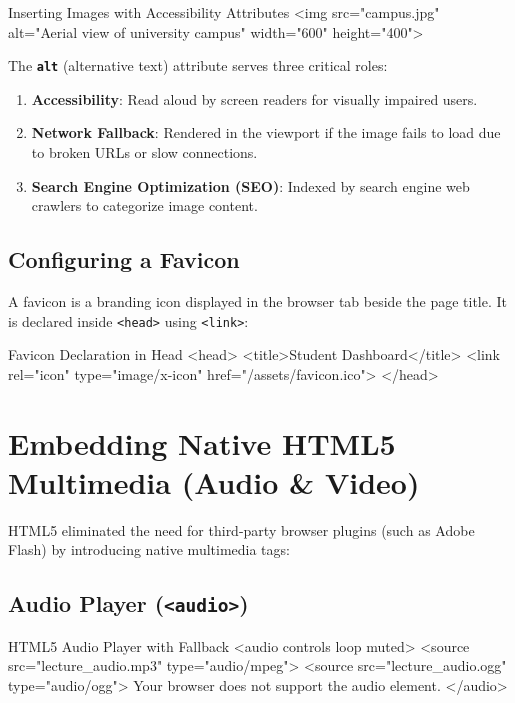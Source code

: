 \begin{htmlcode}{Inserting Images with Accessibility Attributes}
<img src="campus.jpg" alt="Aerial view of university campus" width="600" height="400">
\end{htmlcode}

\begin{conceptbox}
The \textbf{\texttt{alt}} (alternative text) attribute serves three critical roles:
\begin{enumerate}[leftmargin=1.5em]
    \item \textbf{Accessibility}: Read aloud by screen readers for visually impaired users.
    \item \textbf{Network Fallback}: Rendered in the viewport if the image fails to load due to broken URLs or slow connections.
    \item \textbf{Search Engine Optimization (SEO)}: Indexed by search engine web crawlers to categorize image content.
\end{enumerate}
\end{conceptbox}

\subsection{Configuring a Favicon}
A favicon is a branding icon displayed in the browser tab beside the page title. It is declared inside \texttt{<head>} using \texttt{<link>}:
\begin{htmlcode}{Favicon Declaration in Head}
<head>
    <title>Student Dashboard</title>
    <link rel="icon" type="image/x-icon" href="/assets/favicon.ico">
</head>
\end{htmlcode}

\section{Embedding Native HTML5 Multimedia (Audio \& Video)}

HTML5 eliminated the need for third-party browser plugins (such as Adobe Flash) by introducing native multimedia tags:

\subsection{Audio Player (\texttt{<audio>})}
\begin{htmlcode}{HTML5 Audio Player with Fallback}
<audio controls loop muted>
    <source src="lecture_audio.mp3" type="audio/mpeg">
    <source src="lecture_audio.ogg" type="audio/ogg">
    Your browser does not support the audio element.
</audio>
\end{htmlcode}

